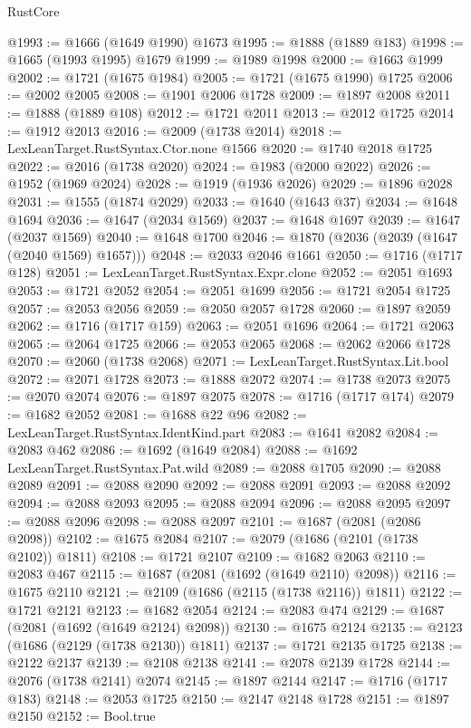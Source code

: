 \begin{lexlean}{RustCore}
\begin{coremodule}
@1993 := @1666 (@1649 @1990) @1673
@1995 := @1888 (@1889 @183)
@1998 := @1665 (@1993 @1995) @1679
@1999 := @1989 @1998
@2000 := @1663 @1999
@2002 := @1721 (@1675 @1984)
@2005 := @1721 (@1675 @1990) @1725
@2006 := @2002 @2005
@2008 := @1901 @2006 @1728
@2009 := @1897 @2008
@2011 := @1888 (@1889 @108)
@2012 := @1721 @2011
@2013 := @2012 @1725
@2014 := @1912 @2013
@2016 := @2009 (@1738 @2014)
@2018 := LexLeanTarget.RustSyntax.Ctor.none @1566
@2020 := @1740 @2018 @1725
@2022 := @2016 (@1738 @2020)
@2024 := @1983 (@2000 @2022)
@2026 := @1952 (@1969 @2024)
@2028 := @1919 (@1936 @2026)
@2029 := @1896 @2028
@2031 := @1555 (@1874 @2029)
@2033 := @1640 (@1643 @37)
@2034 := @1648 @1694
@2036 := @1647 (@2034 @1569)
@2037 := @1648 @1697
@2039 := @1647 (@2037 @1569)
@2040 := @1648 @1700
@2046 := @1870 (@2036 (@2039 (@1647 (@2040 @1569) @1657)))
@2048 := @2033 @2046 @1661
@2050 := @1716 (@1717 @128)
@2051 := LexLeanTarget.RustSyntax.Expr.clone
@2052 := @2051 @1693
@2053 := @1721 @2052
@2054 := @2051 @1699
@2056 := @1721 @2054 @1725
@2057 := @2053 @2056
@2059 := @2050 @2057 @1728
@2060 := @1897 @2059
@2062 := @1716 (@1717 @159)
@2063 := @2051 @1696
@2064 := @1721 @2063
@2065 := @2064 @1725
@2066 := @2053 @2065
@2068 := @2062 @2066 @1728
@2070 := @2060 (@1738 @2068)
@2071 := LexLeanTarget.RustSyntax.Lit.bool
@2072 := @2071 @1728
@2073 := @1888 @2072
@2074 := @1738 @2073
@2075 := @2070 @2074
@2076 := @1897 @2075
@2078 := @1716 (@1717 @174)
@2079 := @1682 @2052
@2081 := @1688 @22 @96
@2082 := LexLeanTarget.RustSyntax.IdentKind.part
@2083 := @1641 @2082
@2084 := @2083 @462
@2086 := @1692 (@1649 @2084)
@2088 := @1692 LexLeanTarget.RustSyntax.Pat.wild
@2089 := @2088 @1705
@2090 := @2088 @2089
@2091 := @2088 @2090
@2092 := @2088 @2091
@2093 := @2088 @2092
@2094 := @2088 @2093
@2095 := @2088 @2094
@2096 := @2088 @2095
@2097 := @2088 @2096
@2098 := @2088 @2097
@2101 := @1687 (@2081 (@2086 @2098))
@2102 := @1675 @2084
@2107 := @2079 (@1686 (@2101 (@1738 @2102)) @1811)
@2108 := @1721 @2107
@2109 := @1682 @2063
@2110 := @2083 @467
@2115 := @1687 (@2081 (@1692 (@1649 @2110) @2098))
@2116 := @1675 @2110
@2121 := @2109 (@1686 (@2115 (@1738 @2116)) @1811)
@2122 := @1721 @2121
@2123 := @1682 @2054
@2124 := @2083 @474
@2129 := @1687 (@2081 (@1692 (@1649 @2124) @2098))
@2130 := @1675 @2124
@2135 := @2123 (@1686 (@2129 (@1738 @2130)) @1811)
@2137 := @1721 @2135 @1725
@2138 := @2122 @2137
@2139 := @2108 @2138
@2141 := @2078 @2139 @1728
@2144 := @2076 (@1738 @2141) @2074
@2145 := @1897 @2144
@2147 := @1716 (@1717 @183)
@2148 := @2053 @1725
@2150 := @2147 @2148 @1728
@2151 := @1897 @2150
@2152 := Bool.true

\end{coremodule}
\end{lexlean}
